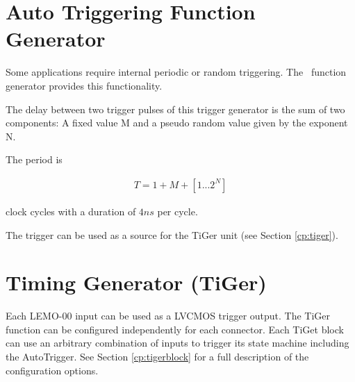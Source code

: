 
\pagebreak
\section{Auto Triggering Function Generator\label{cp:AutoTriggeringFunctionGenerator}}
Some applications require internal periodic or random triggering. The \deviceName\ function generator provides this functionality.\par

The delay between two trigger pulses of this trigger generator is the sum of two components: A fixed value M and a pseudo random value given by the exponent N. \par

The period is

\begin{align}
    T = 1 + M + [1...2^N]
\end{align}

clock cycles with a duration of $4 ns$ per cycle.\par

The trigger can be used as a source for the TiGer unit (see Section \ref{cp:tiger}).


\section{Timing Generator (TiGer)\label{cp:tiger}}
Each LEMO-00 input can be used as a LVCMOS trigger output. The TiGer function can be configured independently for each connector. 
Each TiGet block can use an arbitrary combination of inputs to trigger its state machine including the AutoTrigger.
See Section \ref{cp:tigerblock} for a full description of the configuration options.

